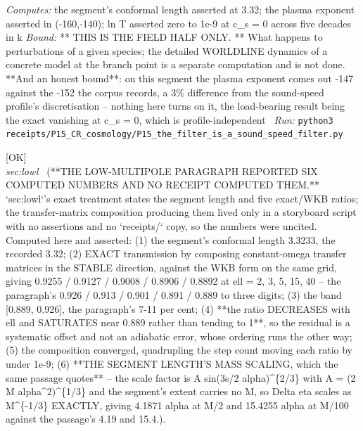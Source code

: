 \begin{description}
\emph{Computes:} the segment's conformal length asserted at 3.32; the plasma exponent asserted in (-160,-140); ln T asserted zero to 1e-9 at c\_s = 0 across five decades in k
 \emph{Bound:} ** THIS IS THE FIELD HALF ONLY. ** What happens to perturbations of a given species; the detailed WORLDLINE dynamics of a concrete model at the branch point is a separate computation and is not done. **And an honest bound**: on this segment the plasma exponent comes out -147 against the -152 the corpus records, a 3\% difference from the sound-speed profile's discretisation -- nothing here turns on it, the load-bearing result being the exact vanishing at c\_s = 0, which is profile-independent
\ \emph{Run:} \texttt{python3 receipts/P15\_CR\_cosmology/P15\_the\_filter\_is\_a\_sound\_speed\_filter.py}
\item[\rcptlabel{P15_the_exact_transmission_ratios_are_recomputed_and_the_offset_saturates}{P15R81}\textbf{P15R81}\quad\texttt{P15\_the\_exact\_transmission\_ratios\_are\_recomputed\_and\_the\_offset\_saturates}]\hfill\textsf{[OK]}\\
\textit{sec:lowl} \ (**THE LOW-MULTIPOLE PARAGRAPH REPORTED SIX COMPUTED NUMBERS AND NO RECEIPT COMPUTED THEM.** `sec:lowl`'s exact treatment states the segment length and five exact/WKB ratios; the transfer-matrix composition producing them lived only in a storyboard script with no assertions and no `receipts/` copy, so the numbers were uncited. Computed here and asserted: (1) the segment's conformal length 3.3233, the recorded 3.32; (2) EXACT transmission by composing constant-omega transfer matrices in the STABLE direction, against the WKB form on the same grid, giving 0.9255 / 0.9127 / 0.9008 / 0.8906 / 0.8892 at ell = 2, 3, 5, 15, 40 -- the paragraph's 0.926 / 0.913 / 0.901 / 0.891 / 0.889 to three digits; (3) the band [0.889, 0.926], the paragraph's 7-11 per cent; (4) **the ratio DECREASES with ell and SATURATES near 0.889 rather than tending to 1**, so the residual is a systematic offset and not an adiabatic error, whose ordering runs the other way; (5) the composition converged, quadrupling the step count moving each ratio by under 1e-9; (6) **THE SEGMENT LENGTH'S MASS SCALING, which the same passage quotes** -- the scale factor is A \textbar{}sin(3s/2 alpha)\textbar{}\textasciicircum{}\{2/3\} with A = (2 M alpha\textasciicircum{}2)\textasciicircum{}\{1/3\} and the segment's extent carries no M, so \textbar{}Delta eta\textbar{} scales as M\textasciicircum{}\{-1/3\} EXACTLY, giving 4.1871 alpha at M/2 and 15.4255 alpha at M/100 against the passage's 4.19 and 15.4.). 

\end{description}
